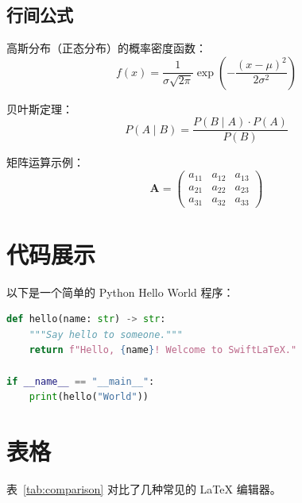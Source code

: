 \documentclass[12pt, a4paper]{article}
\begin{document}
\subsection{行间公式}

高斯分布（正态分布）的概率密度函数：
\begin{equation}
    f(x) = \frac{1}{\sigma\sqrt{2\pi}} \exp\left(-\frac{(x-\mu)^2}{2\sigma^2}\right)
    \label{eq:gaussian}
\end{equation}

贝叶斯定理：
\begin{equation}
    P(A \mid B) = \frac{P(B \mid A) \cdot P(A)}{P(B)}
    \label{eq:bayes}
\end{equation}

矩阵运算示例：
\begin{equation}
    \mathbf{A} = \begin{pmatrix}
        a_{11} & a_{12} & a_{13} \\
        a_{21} & a_{22} & a_{23} \\
        a_{31} & a_{32} & a_{33}
    \end{pmatrix}
\end{equation}

\section{代码展示}

以下是一个简单的 Python Hello World 程序：

\begin{lstlisting}[language=Python, caption={Python 示例}]
def hello(name: str) -> str:
    """Say hello to someone."""
    return f"Hello, {name}! Welcome to SwiftLaTeX."

if __name__ == "__main__":
    print(hello("World"))
\end{lstlisting}

\section{表格}

表~\ref{tab:comparison} 对比了几种常见的 \LaTeX{} 编辑器。
\end{document}
